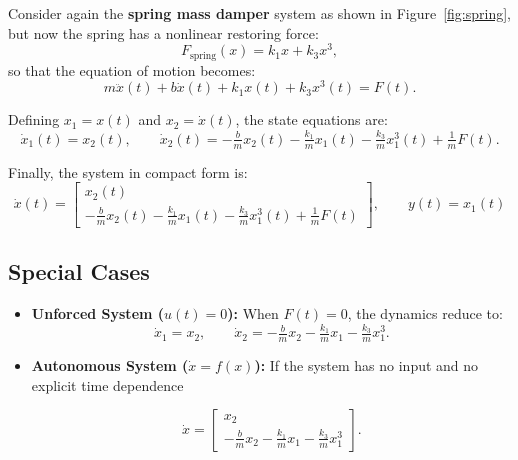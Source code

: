 \begin{example}
Consider again the \textbf{spring mass damper} system as shown in Figure~\ref{fig:spring}, 
but now the spring has a nonlinear restoring force:
\begin{equation}
    F_{\text{spring}}(x) = k_1 x + k_3 x^3,
\end{equation}
so that the equation of motion becomes:
\begin{equation}
    m\ddot{x}(t) + b\dot{x}(t) + k_1 x(t) + k_3 x^3(t) = F(t).
\end{equation}

\medskip

Defining $x_1 = x(t)$ and $x_2 = \dot{x}(t)$, the state equations are:
\begin{equation}
    \dot{x}_1(t) = x_2(t), 
    \qquad
    \dot{x}_2(t) = -\tfrac{b}{m}x_2(t) - \tfrac{k_1}{m}x_1(t) - \tfrac{k_3}{m}x_1^3(t) + \tfrac{1}{m}F(t).
\end{equation}

\medskip

Finally, the system in compact form is:
\begin{equation}
\boxed{
\dot{x}(t) =
\begin{bmatrix}
x_2(t) \\[6pt]
-\tfrac{b}{m}x_2(t) - \tfrac{k_1}{m}x_1(t) - \tfrac{k_3}{m}x_1^3(t) + \tfrac{1}{m}F(t)
\end{bmatrix},
\qquad
y(t) = x_1(t)
}
\end{equation}
\end{example}

\subsection{Special Cases}
\begin{itemize}
    \item \textbf{Unforced System ($u(t)=0$):}  
    When $F(t)=0$, the dynamics reduce to:
    \begin{equation}
        \dot{x}_1 = x_2, \qquad 
        \dot{x}_2 = -\tfrac{b}{m}x_2 - \tfrac{k_1}{m}x_1 - \tfrac{k_3}{m}x_1^3.
    \end{equation}

    \item \textbf{Autonomous System ($\dot{x}=f(x)$):}  
    If the system has no input and no explicit time dependence
    
    \begin{equation}
        \dot{x} =
        \begin{bmatrix}
        x_2 \\
        -\tfrac{b}{m}x_2 - \tfrac{k_1}{m}x_1 - \tfrac{k_3}{m}x_1^3
        \end{bmatrix}.
    \end{equation}
\end{itemize}

